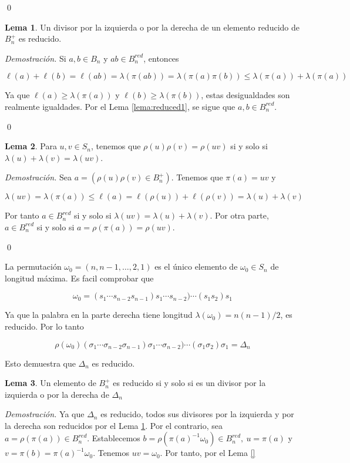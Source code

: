 \documentclass[12pt]{article}
\theoremstyle{definition}
\newtheorem{lema}{Lema}[section]
\begin{document}
\qed

\begin{lema}
Un divisor por la izquierda o por la derecha de un elemento reducido de $B_n^+$ es reducido.
\label{lema:reduced2}
\end{lema}

\textit{Demostración.} Si $a,b\in B_n$ y $ab\in B_n^{red}$, entonces

$$\ell(a) + \ell(b)= \ell(ab)=\lambda(\pi(ab))=\lambda(\pi(a)\pi(b))\leq \lambda(\pi(a))+\lambda(\pi(a))$$

Ya que $\ell(a)\geq \lambda(\pi(a))$ y $\ell(b)\geq \lambda(\pi(b))$, estas desigualdades son realmente igualdades. Por el Lema \ref{lema:reduced1}, se sigue que $a,b\in B_n^{red}$.

\qed

\begin{lema}
Para $u,v\in S_n$, tenemos que $\rho(u)\rho(v)=\rho(uv)$ si y solo si $\lambda(u)+\lambda(v)=\lambda(uv)$.
\label{lema:longi}
\end{lema}

\textit{Demostración.} Sea $a=(\rho(u)\rho(v)\in B_n^+)$. Tenemos que $\pi(a)= uv$ y 

$$\lambda(uv)=\lambda(\pi(a))\leq\ell(a)=\ell(\rho(u))+\ell(\rho(v))=\lambda(u)+\lambda(v)$$

Por tanto $a\in B_n^{red}$ si y solo si $\lambda(uv)=\lambda(u)+\lambda(v)$. Por otra parte, $a\in B_n^{red}$ si y solo si $a=\rho(\pi(a))=\rho(uv)$.

\qed

La permutación $\omega_0=(n,n-1,\ldots,2,1)$ es el único elemento de $\omega_0\in S_n$ de longitud máxima. Es facil comprobar que

$$\omega_0=(s_1\cdots s_{n-2}s_{n-1})s_1\cdots s_{n-2})\cdots(s_1s_2)s_1$$

Ya que la palabra en la parte derecha tiene longitud $\lambda(\omega_0)=n(n-1)/2$, es reducido. Por lo tanto

$$\rho(\omega_0)(\sigma_1\cdots \sigma_{n-2}\sigma_{n-1})\sigma_1\cdots \sigma_{n-2})\cdots(\sigma_1\sigma_2)\sigma_1=\Delta_n$$

Esto demuestra que $\Delta_n$ es reducido.

\begin{lema}
Un elemento de $B_n^+$ es reducido si y solo si es un divisor por la izquierda o por la derecha de $\Delta_n$
\label{lema:reduced3}
\end{lema}

\textit{Demostración.} Ya que $\Delta_n$ es reducido, todos sus divisores por la izquierda y por la derecha son reducidos por el Lema \ref{lema:reduced2}.
\newline
\newline
Por el contrario, sea $a=\rho(\pi(a))\in B_n^{red}$. Establecemos $b=\rho(\pi(a)^{-1}\omega_0)\in B_n^{red},\ u=\pi(a)$ y $v=\pi(b)=\pi(a)^{-1}\omega_0$. Tenemos $uv=\omega_0$. Por tanto, por el Lema \ref{}
\end{document}
